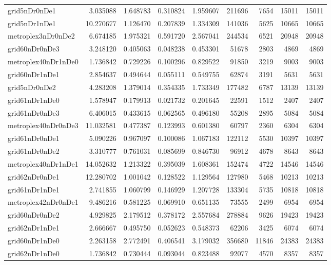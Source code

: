 \documentclass[../../../thesis.tex]{subfiles}
\begin{document}
\begin{longtable}{|l|r|r|r|r|r|r|r|r|}
grid5nDr0nDe1 & 3.035088 & 1.648783 & 0.310824 & 1.959607 & 211696 & 7654 & 15011 & 15011 \\
grid5nDr1nDe1 & 10.270677 & 1.126470 & 0.207839 & 1.334309 & 141036 & 5625 & 10665 & 10665 \\
metroplex3nDr0nDe2 & 6.674185 & 1.975321 & 0.591720 & 2.567041 & 244534 & 6521 & 20948 & 20948 \\
grid60nDr0nDe3 & 3.248120 & 0.405063 & 0.048238 & 0.453301 & 51678 & 2803 & 4869 & 4869 \\
metroplex40nDr1nDe0 & 1.736842 & 0.729226 & 0.100296 & 0.829522 & 91850 & 3219 & 9003 & 9003 \\
grid60nDr1nDe1 & 2.854637 & 0.494644 & 0.055111 & 0.549755 & 62874 & 3191 & 5631 & 5631 \\
grid5nDr0nDe2 & 4.283208 & 1.379014 & 0.354335 & 1.733349 & 177482 & 6787 & 13139 & 13139 \\
grid61nDr1nDe0 & 1.578947 & 0.179913 & 0.021732 & 0.201645 & 22591 & 1512 & 2407 & 2407 \\
grid61nDr0nDe3 & 6.406015 & 0.433615 & 0.062565 & 0.496180 & 55208 & 2895 & 5084 & 5084 \\
metroplex40nDr0nDe3 & 11.032581 & 0.477387 & 0.123993 & 0.601380 & 60797 & 2360 & 6304 & 6304 \\
grid61nDr0nDe1 & 5.090226 & 0.967097 & 0.100086 & 1.067183 & 122112 & 5530 & 10397 & 10397 \\
grid61nDr0nDe2 & 3.310777 & 0.761031 & 0.085699 & 0.846730 & 96912 & 4678 & 8643 & 8643 \\
metroplex40nDr1nDe1 & 14.052632 & 1.213322 & 0.395039 & 1.608361 & 152474 & 4722 & 14546 & 14546 \\
grid62nDr0nDe1 & 12.280702 & 1.001042 & 0.128522 & 1.129564 & 127980 & 5468 & 10213 & 10213 \\
grid61nDr1nDe1 & 2.741855 & 1.060799 & 0.146929 & 1.207728 & 133304 & 5735 & 10818 & 10818 \\
metroplex42nDr0nDe1 & 9.486216 & 0.581225 & 0.069910 & 0.651135 & 73555 & 2499 & 6954 & 6954 \\
grid60nDr0nDe2 & 4.929825 & 2.179512 & 0.378172 & 2.557684 & 278884 & 9626 & 19423 & 19423 \\
grid62nDr1nDe1 & 2.666667 & 0.495750 & 0.052623 & 0.548373 & 62206 & 3425 & 6074 & 6074 \\
grid60nDr1nDe0 & 2.263158 & 2.772491 & 0.406541 & 3.179032 & 356680 & 11846 & 24383 & 24383 \\
grid62nDr1nDe0 & 1.736842 & 0.730444 & 0.093044 & 0.823488 & 92077 & 4570 & 8357 & 8357 \\

\end{longtable}
\end{document}
